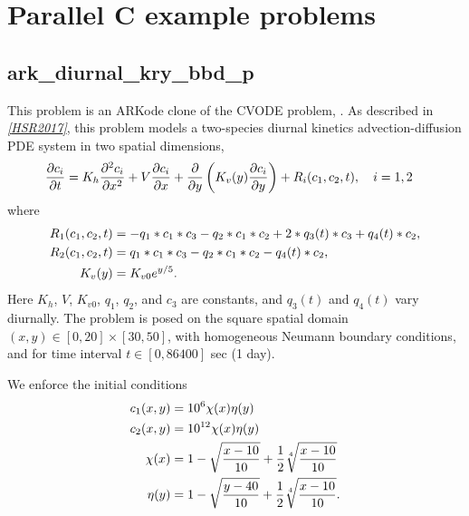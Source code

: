 \documentclass[letterpaper,10pt,english]{sphinxmanual}
\begin{document}
\chapter{Parallel C example problems}
\label{c_parallel::doc}\label{c_parallel:parallel-c-example-problems}\label{c_parallel:parallel-c}

\section{ark\_diurnal\_kry\_bbd\_p}
\label{c_parallel:ark-diurnal-kry-bbd-p}\label{c_parallel:id1}
This problem is an ARKode clone of the CVODE problem,
.  As described in \label{c_parallel:id2}{\hyperref[References:hsr2017]{\emph{{[}HSR2017{]}}}}, this problem
models a two-species diurnal kinetics advection-diffusion PDE system
in two spatial dimensions,
\begin{gather}
\begin{split}\frac{\partial c_i}{\partial t} &=
  K_h \frac{\partial^2 c_i}{\partial x^2} +
  V \frac{\partial     c_i}{\partial x} +
  \frac{\partial}{\partial y}\left( K_v(y)
  \frac{\partial c_i}{\partial y}\right) +
  R_i(c_1,c_2,t),\quad i=1,2\end{split}\notag
\end{gather}
where
\begin{gather}
\begin{split}R_1(c_1,c_2,t) &= -q_1*c_1*c_3 - q_2*c_1*c_2 + 2*q_3(t)*c_3 + q_4(t)*c_2, \\
R_2(c_1,c_2,t) &=  q_1*c_1*c_3 - q_2*c_1*c_2 - q_4(t)*c_2, \\
K_v(y) &= K_{v0} e^{y/5}.\end{split}\notag
\end{gather}
Here \(K_h\), \(V\), \(K_{v0}\), \(q_1\), \(q_2\),
and \(c_3\) are constants, and \(q_3(t)\) and \(q_4(t)\)
vary diurnally.  The problem is posed on the square spatial domain
\((x,y) \in [0,20]\times[30,50]\), with homogeneous Neumann
boundary conditions, and for time interval \(t\in [0,86400]\) sec
(1 day).

We enforce the initial conditions
\begin{gather}
\begin{split}c_1(x,y) &=  10^6 \chi(x)\eta(y) \\
c_2(x,y) &=  10^{12} \chi(x)\eta(y) \\
\chi(x) &= 1 - \sqrt{\frac{x - 10}{10}} + \frac12 \sqrt[4]{\frac{x - 10}{10}} \\
\eta(y) &= 1 - \sqrt{\frac{y - 40}{10}} + \frac12 \sqrt[4]{\frac{x - 10}{10}}.\end{split}\notag
\end{gather}
\end{document}
